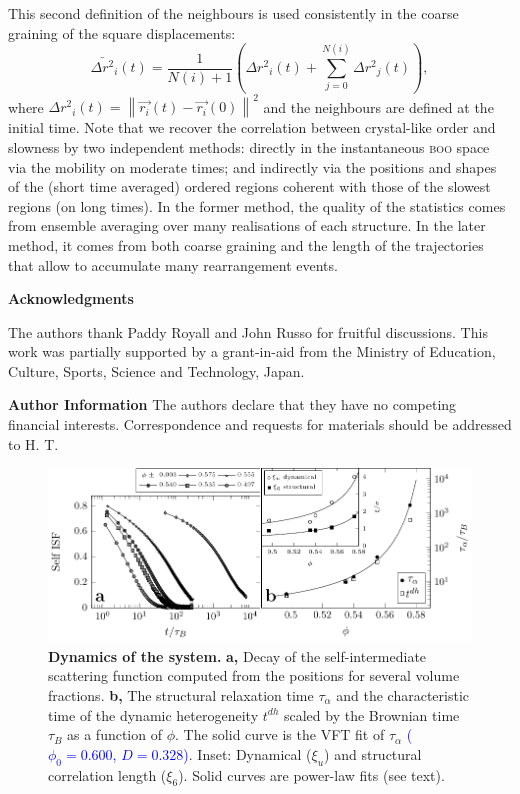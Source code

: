 This second definition of the neighbours is used consistently in the coarse graining of the square displacements:
\begin{equation}
	\bar{\Delta r^2}_i(t) = \frac{1}{N(i)+1}\left( {\Delta r^2}_i(t) + \sum_{j=0}^{N(i)} {\Delta r^2}_j(t) \right),
	\label{eq:Mu}
\end{equation}
where ${\Delta r^2}_i(t) = \left\|\vec{r_i}(t)-\vec{r_i}(0)\right\|^2$ and the neighbours are defined at the initial time. Note that we recover the correlation between crystal-like order and slowness by two independent methods: directly in the instantaneous \textsc{boo} space via the mobility on moderate times; and indirectly via the positions and shapes of the (short time averaged) ordered regions coherent with those of the slowest regions (on long times). In the former method, the quality of the statistics comes from ensemble averaging over many realisations of each structure. In the later method, it comes from both coarse graining and the length of the trajectories that allow to accumulate many rearrangement events.

%



\vspace{2cm}
\noindent
\textbf{Acknowledgments}

\noindent
The authors thank Paddy Royall and John Russo for fruitful discussions. 
This work was partially supported by a grant-in-aid from the 
Ministry of Education, Culture, Sports, Science and Technology, Japan. 

\sloppy
\noindent
{\bf Author Information} 
The authors declare that they have no competing financial interests. 
Correspondence and requests for materials should be addressed to 
H. T. 

\clearpage

\begin{figure}
\begin{center}
\includegraphics{generate_figures-figure0.pdf}
\end{center}
\caption{\textbf{Dynamics of the system.} {\bf a,} Decay of the self-intermediate scattering function computed from the positions for several volume fractions. {\bf b,} The structural relaxation time $\tau_\alpha$ and the characteristic time of the dynamic heterogeneity $t^{dh}$ scaled by the Brownian time $\tau_B$ as a function of $\phi$. The solid curve is the VFT fit of $\tau_\alpha$ \textcolor{blue}{($\phi_0=0.600$, $D=0.328$)}. Inset: Dynamical ($\xi_u$) and structural correlation length ($\xi_6$). Solid curves are power-law fits (see text).}
	\label{fig:vft}
\end{figure}

